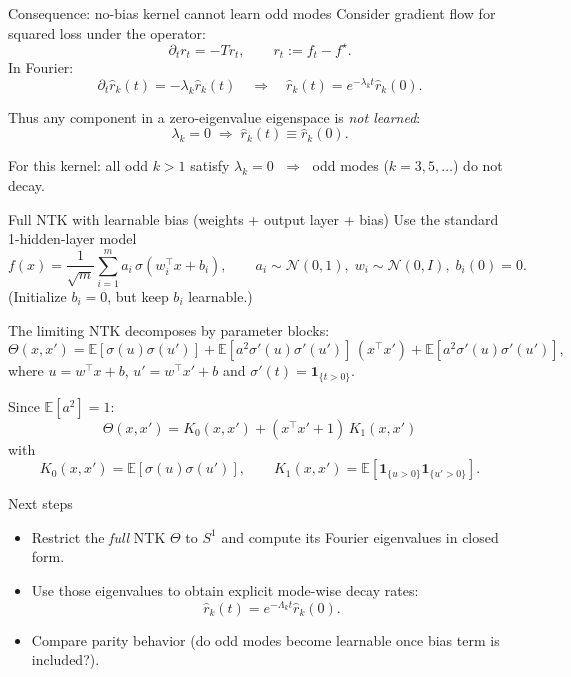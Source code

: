 \documentclass[10pt,aspectratio=169]{beamer}
\newcommand{\E}{\mathbb{E}}
\begin{document}
\begin{frame}{Consequence: no-bias kernel cannot learn odd modes}
	Consider gradient flow for squared loss under the operator:
	\[
		\partial_t r_t = -Tr_t,\qquad r_t := f_t - f^\star.
	\]
	In Fourier:
	\[
		\partial_t \hat r_k(t)=-\lambda_k \hat r_k(t)
		\quad\Rightarrow\quad
		\hat r_k(t)=e^{-\lambda_k t}\hat r_k(0).
	\]

	Thus any component in a zero-eigenvalue eigenspace is \emph{not learned}:
	\[
		\lambda_k=0\;\Rightarrow\; \hat r_k(t)\equiv \hat r_k(0).
	\]

	For this kernel: all odd $k>1$ satisfy $\lambda_k=0$ $\;\Rightarrow\;$
	odd modes ($k=3,5,\dots$) do not decay.
\end{frame}

\begin{frame}{Full NTK with learnable bias (weights + output layer + bias)}
	Use the standard 1-hidden-layer model
	\[
		f(x)=\frac{1}{\sqrt m}\sum_{i=1}^m a_i\,\sigma(w_i^\top x+b_i),
		\qquad
		a_i\sim\mathcal N(0,1),\; w_i\sim\mathcal N(0,I),\; b_i(0)=0.
	\]
	(Initialize $b_i=0$, but keep $b_i$ learnable.)

	The limiting NTK decomposes by parameter blocks:
	\[
		\Theta(x,x')=
		\E[\sigma(u)\sigma(u')]
		+\E[a^2\sigma'(u)\sigma'(u')]\,(x^\top x')
		+\E[a^2\sigma'(u)\sigma'(u')],
	\]
	where $u=w^\top x+b$, $u'=w^\top x'+b$ and $\sigma'(t)=\mathbf 1_{\{t>0\}}$.

	Since $\E[a^2]=1$:
	\[
		\boxed{\Theta(x,x')=K_0(x,x') + (x^\top x' + 1)\,K_1(x,x')}
	\]
	with
	\[
		K_0(x,x')=\E[\sigma(u)\sigma(u')],\qquad
		K_1(x,x')=\E[\mathbf 1_{\{u>0\}}\mathbf 1_{\{u'>0\}}].
	\]
\end{frame}

\begin{frame}{Next steps}
	\begin{itemize}
		\item Restrict the \emph{full} NTK $\Theta$ to $S^1$ and compute its Fourier eigenvalues in closed form.
		\item Use those eigenvalues to obtain explicit mode-wise decay rates:
		      \[
			      \hat r_k(t)=e^{-\Lambda_k t}\hat r_k(0).
		      \]
		\item Compare parity behavior (do odd modes become learnable once bias term is included?).
	\end{itemize}
\end{frame}


\end{document}
